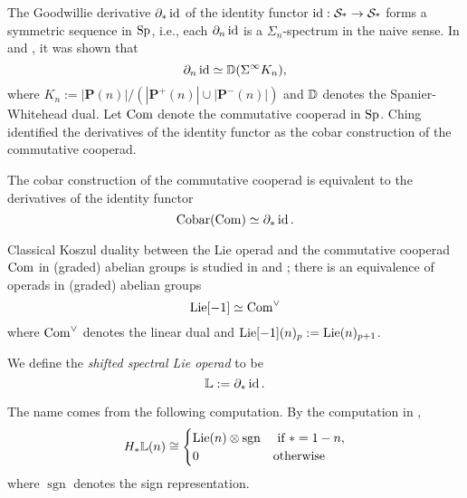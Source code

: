 	The Goodwillie derivative $\partial_* \operatorname{id}$ of the identity functor $\operatorname{id}: \operatorname{\mathcal{S}_{*}} \to \operatorname{\mathcal{S}_{*}}$ forms a symmetric sequence in $\operatorname{Sp}$, i.e., each $\partial_n \operatorname{id}$ is a $\Sigma_n$-spectrum in the naive sense. In \cite{JohnsonDerivative} and \cite{Arone-Mahowald}, it was shown that
	$$
	\partial_n \operatorname{id} \simeq {\mathbb{D}}(\Sigma^{\infty} K_n),
	$$
	where 
	$
	K_{n}:=|\mathbf{P}(n)| /\left(\left|\mathbf{P}^{+}(n)\right| \cup\left|\mathbf{P}^{-}(n)\right|\right)
	$
	and ${\mathbb{D}}$ denotes the Spanier-Whitehead dual. 
	Let $\operatorname{Com}$ denote the commutative cooperad in $\operatorname{Sp}$.
	Ching \cite{ChingBar} identified the derivatives of the identity functor as the cobar construction of the commutative cooperad.
	\begin{proposition}
	\cite[Remark 8.9]{ChingBar}
	The cobar construction of the commutative cooperad is equivalent to the derivatives of the identity functor
	$$
	\operatorname{Cobar}(\operatorname{Com})\simeq \partial_* \operatorname{id}.
	$$
	\end{proposition}
	
	\begin{remark}
    Classical Koszul duality between the Lie operad and the commutative cooperad $\operatorname{Com}$ in (graded) abelian groups is studied in \cite{Ginzburg-Kapranov} and \cite{Loday-Vallette};
    there is an equivalence of operads in (graded) abelian groups
    \[
    \operatorname{Lie}[-1] \simeq \operatorname{Com}^{\vee}
    \]
    where $\operatorname{Com}^{\vee}$ denotes the linear dual and $\operatorname{Lie}[-1](n)_p:=\operatorname{Lie}(n)_{p+1}$.
    \end{remark}
    
	\begin{definition}
	\label{Shifted Spectral Lie Operad}
	    	We define the \emph{shifted spectral Lie operad} to be
	    	$$
	    	{\mathbb{L}}:= \partial_* \operatorname{id}.
	    	$$
	\end{definition}

	The name comes from the following computation. By the computation in \cite[Example 9.50]{ChingBar},
	$$
	H_{*}{\mathbb{L}}(n) \cong 	
	\begin{cases}
	\operatorname{Lie}(n) \otimes \operatorname{sgn}& \text{ if $*=1-n$},\\
	0 & \text{otherwise}
	\end{cases}
	$$	
	where $\operatorname{sgn}$ denotes the sign representation.


